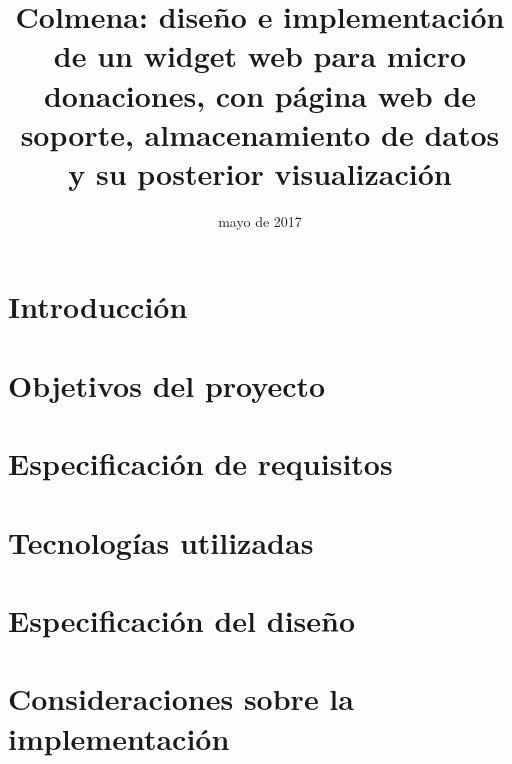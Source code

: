 \documentclass{memoriaPFC}
\title{Colmena: diseño e implementación de un widget web para micro donaciones, con página web de soporte, almacenamiento de datos y su posterior visualización}
\date{mayo de 2017}
\begin{document}
\frontmatter
\hacerportada
\hacerresumen
\tableofcontents
\listoffigures %
\listoftables %
\lstlistoflistings %

\mainmatter
\chapter{Introducción}



\chapter{Objetivos del proyecto}



\chapter{Especificación de requisitos}



\chapter{Tecnologías utilizadas}



\chapter{Especificación del diseño}



\chapter{Consideraciones sobre la implementación}



\backmatter
\appendix

%

\end{document}
